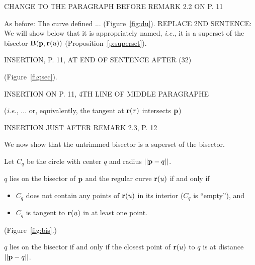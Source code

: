 \clearpage

CHANGE TO THE PARAGRAPH BEFORE REMARK 2.2 ON P. 11

As before: The curve defined ... (Figure~\ref{fig:du}).
REPLACE 2ND SENTENCE:
We will show below that it is appropriately named, {\em i.e.}, it
is a superset of the bisector ${\bf B}({\bf p},{\bf r}(u))$ 
(Proposition~\ref{p:superset}).


\clearpage

INSERTION, P. 11, AT END OF SENTENCE AFTER (32)

(Figure~\ref{fig:sec}).



\clearpage

INSERTION ON P. 11, 4TH LINE OF MIDDLE PARAGRAPHE

({\em i.e.}, ... or, equivalently, the tangent at ${\bf r}(\tau)$ intersects 
${\bf p}$)


\clearpage

INSERTION JUST AFTER REMARK 2.3, P. 12

We now show that the untrimmed bisector is a superset of the bisector.

\begin{dfn}
Let $C_{q}$ be the circle with center $q$ and radius $||{\bf p}-q||$.
\end{dfn}

\begin{rmk}
\label{rmk:bis}
$q$ lies on the bisector of ${\bf p}$ and the regular curve 
${\bf r}(u)$ if and only if 
\begin{itemize}
\item
$C_q$ does not contain any 
points of ${\bf r}(u)$ in its interior ($C_q$ is ``empty''), and 
\item
$C_q$ is tangent to ${\bf r}(u)$ in at least one 
point.
\end{itemize}
(Figure~\ref{fig:bis}.)
\end{rmk}
\prf
$q$ lies on the bisector if and only if the closest point of ${\bf r}(u)$
to $q$ is at distance $||{\bf p}-q||$.
\QED

